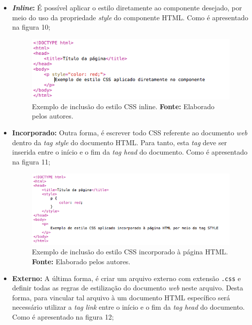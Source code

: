 \begin{itemize}
	\item \textbf{\textit{Inline}:} É possível aplicar o estilo diretamente ao componente desejado, por meio do uso da propriedade \textit{style} do componente HTML. Como é apresentado na figura 10;
	
	\newpage
	\begin{figure}[h!]
		\centerline{\includegraphics[scale=0.8]{./imagens/example_css_inline.png}}
		\caption[Exemplo de inclusão do estilo CSS inline]
		{Exemplo de inclusão do estilo CSS inline. \textbf{Fonte:} Elaborado pelos autores.}
		\label{fig:exemplo1}
	\end{figure}
	
	\item \textbf{Incorporado:} Outra forma, é escrever todo CSS referente ao  documento \textit{web} dentro da \textit{tag style} do documento HTML. Para tanto, esta \textit{tag} deve ser inserida entre o início e o fim da \textit{tag head} do documento. Como é apresentado na figura 11;
	
	\begin{figure}[h!]
		\centerline{\includegraphics[scale=0.8]{./imagens/example_css_incorpored.png}}
		\caption[Exemplo de inclusão do estilo CSS incorporado à página HTML]
		{Exemplo de inclusão do estilo CSS incorporado à página HTML. \textbf{Fonte:} Elaborado pelos autores.}
		\label{fig:exemplo1}
	\end{figure}
	 
	\item \textbf{Externo:} A última forma, é criar um arquivo externo com extensão \texttt{.css} e definir todas as regras de estilização do documento \textit{web} neste arquivo. Desta forma, para vincular tal arquivo à um documento HTML específico será necessário utilizar a \textit{tag link} entre o início e o fim da \textit{tag head} do documento. Como é apresentado na figura 12;
	

\end{itemize}
